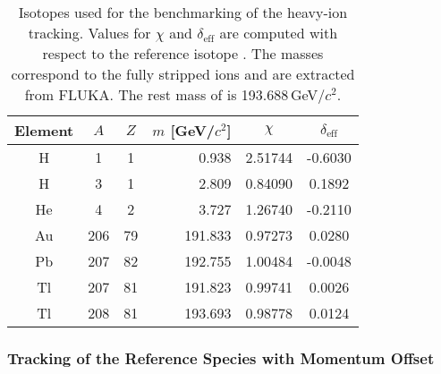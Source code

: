 \begin{table}[htbp]
\centering
\caption{Isotopes used for the benchmarking of the heavy-ion tracking. Values for $\chi$ and $\delta_\text{eff}$ are computed with respect to the reference isotope \lead. The masses correspond to the fully stripped ions and are extracted from FLUKA. The rest mass of \lead is 193.688\,GeV/$c^2$.}
\label{tab:15080501}

\begin{tabular}{cccrcc}
\toprule
Element & $A$ & $Z$ & $m$ [GeV/$c^2$] & $\chi$   & $\delta_\text{eff}$ \\ \midrule
H       & \phantom{12}1   & \phantom{1}1   & 0.938         & 2.51744  & -0.6030              \\
H       & \phantom{12}3   & \phantom{1}1   & 2.809      & 0.84090  & \phantom{-}0.1892              \\
He      & \phantom{12}4   & \phantom{1}2   & 3.727         & 1.26740  & -0.2110              \\
Au      & 206 & 79  & 191.833      & 0.97273  & \phantom{-}0.0280             \\
Pb      & 207 & 82  & 192.755      & 1.00484  & -0.0048             \\
Tl      & 207 & 81  & 191.823      & 0.99741       & \phantom{-}0.0026           \\
Tl      & 208 & 81  & 193.693      & 0.98778 & \phantom{-}0.0124           \\ \bottomrule
\end{tabular}
\end{table}



\subsubsection{Tracking of the Reference Species with Momentum Offset}



